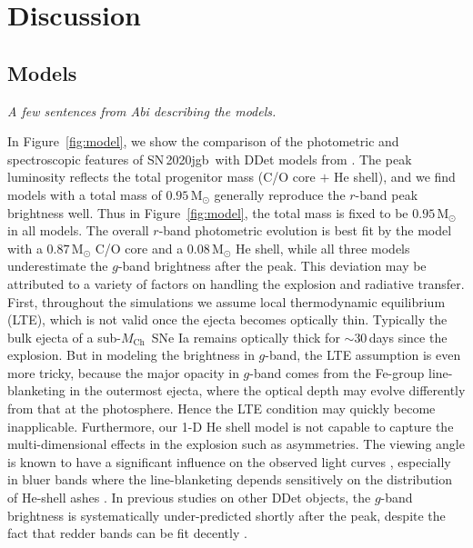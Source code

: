\documentclass[twocolumn]{aastex631}
\newcommand{\sn}{SN\,2020jgb}
\newcommand{\Mch}{$M_\mathrm{Ch}$}
\begin{document}
\section{Discussion} \label{sec:discussion}
\subsection{Models} \label{sec:model}
{\it A few sentences from Abi describing the models.}

In Figure~\ref{fig:model}, we show the comparison of the photometric and spectroscopic features of \sn\ with DDet models from \citet{polin_observational_2019}. The peak luminosity reflects the total progenitor mass (C/O core $+$ He shell), and we find models with a total mass of $0.95\,\mathrm{M_\odot}$ generally reproduce the $r$-band peak brightness well. Thus in Figure~\ref{fig:model}, the total mass is fixed to be $0.95\,\mathrm{M_\odot}$ in all models. The overall $r$-band photometric evolution is best fit by the model with a $0.87\,\mathrm{M_\odot}$ C/O core and a $0.08\,\mathrm{M_\odot}$ He shell, while all three models underestimate the $g$-band brightness after the peak. This deviation may be attributed to a variety of factors on handling the explosion and radiative transfer. First, throughout the simulations we assume local thermodynamic equilibrium (LTE), which is not valid once the ejecta becomes optically thin. Typically the bulk ejecta of a sub-\Mch\ SNe Ia remains optically thick for $\sim$30\,days since the explosion. But in modeling the brightness in $g$-band, the LTE assumption is even more tricky, because the major opacity in $g$-band comes from the Fe-group line-blanketing in the outermost ejecta, where the optical depth may evolve differently from that at the photosphere. Hence the LTE condition may quickly become inapplicable. Furthermore, our 1-D He shell model is not capable to capture the multi-dimensional effects in the explosion such as asymmetries. The viewing angle is known to have a significant influence on the observed light curves \citep{Kromer_DD_2010, Sim_2012, Gronow_2020, Shen_2D_2021}, especially in bluer bands where the line-blanketing depends sensitively on the distribution of He-shell ashes \citep{Shen_2D_2021}. In previous studies on other DDet objects, the $g$-band brightness is systematically under-predicted shortly after the peak, despite the fact that redder bands can be fit decently \citep[e.g.][]{jiang_16jhr_2017,jacobson-galan_16hnk_2020}.
\end{document}
